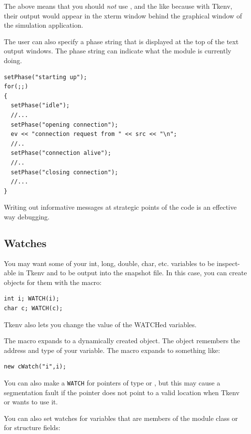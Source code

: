 The above means that you should \textit{not} use ,
 \fname{<<} and the like because with Tkenv, their output
would appear in the xterm window behind the graphical window of the
simulation application.

The user can also specify a phase string that is
displayed at the top of the text output windows. The phase string can
indicate what the module is currently doing.

\begin{Verbatim}
setPhase("starting up");
for(;;)
{
  setPhase("idle");
  //... 
  setPhase("opening connection");
  ev << "connection request from " << src << "\n";
  //..
  setPhase("connection alive");
  //.. 
  setPhase("closing connection");
  //...
}
\end{Verbatim}

Writing out informative messages at strategic points of the code 
is an effective way debugging.



\subsection{Watches}

You may want some of your int, long, double, char, etc. variables to
be inspect-able in Tkenv and to be output into the snapshot
file. In this case, you can create
 objects for them with the  macro:

\begin{Verbatim}
int i; WATCH(i);
char c; WATCH(c);
\end{Verbatim}


Tkenv also lets you change the value of the WATCHed variables.

The  macro expands to a dynamically created 
object.  The object remembers the address and type of your variable.
The macro expands to something like:

\begin{Verbatim}
new cWatch("i",i);
\end{Verbatim}


You can also make a \texttt{WATCH} for pointers of type  or
, but this may cause a segmentation fault if
the pointer does not point to a valid location when Tkenv or
 wants to use it.

You can also set watches for variables that are members of the 
module class or for structure fields:

